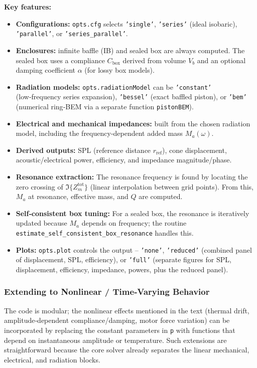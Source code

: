 \textbf{Key features:}
\begin{itemize}
  \item \textbf{Configurations:} \texttt{opts.cfg} selects \texttt{'single'}, \texttt{'series'} (ideal isobaric), \texttt{'parallel'}, or \texttt{'series\_parallel'}.  
  \item \textbf{Enclosures:} infinite baffle (IB) and sealed box are always computed. The sealed box uses a compliance $C_{\text{box}}$ derived from volume $V_b$ and an optional damping coefficient $\alpha$ (for lossy box models).  
  \item \textbf{Radiation models:} \texttt{opts.radiationModel} can be \texttt{'constant'} (low‑frequency series expansion), \texttt{'bessel'} (exact baffled piston), or \texttt{'bem'} (numerical ring‑BEM via a separate function \texttt{pistonBEM}).  
  \item \textbf{Electrical and mechanical impedances:} built from the chosen radiation model, including the frequency‑dependent added mass $M_a(\omega)$.  
  \item \textbf{Derived outputs:} SPL (reference distance $r_{\text{ref}}$), cone displacement, acoustic/electrical power, efficiency, and impedance magnitude/phase.  
  \item \textbf{Resonance extraction:} The resonance frequency is found by locating the zero crossing of $\Im\{Z_m^{\text{tot}}\}$ (linear interpolation between grid points). From this, $M_a$ at resonance, effective mass, and $Q$ are computed.  
  \item \textbf{Self‑consistent box tuning:} For a sealed box, the resonance is iteratively updated because $M_a$ depends on frequency; the routine \texttt{estimate\_self\_consistent\_box\_resonance} handles this.  
  \item \textbf{Plots:} \texttt{opts.plot} controls the output – \texttt{'none'}, \texttt{'reduced'} (combined panel of displacement, SPL, efficiency), or \texttt{'full'} (separate figures for SPL, displacement, efficiency, impedance, powers, plus the reduced panel).
\end{itemize}

\subsubsection{Extending to Nonlinear / Time‑Varying Behavior}
The code is modular; the nonlinear effects mentioned in the text (thermal drift, amplitude‑dependent compliance/damping, motor force variation) can be incorporated by replacing the constant parameters in \texttt{p} with functions that depend on instantaneous amplitude or temperature. Such extensions are straightforward because the core solver already separates the linear mechanical, electrical, and radiation blocks.



